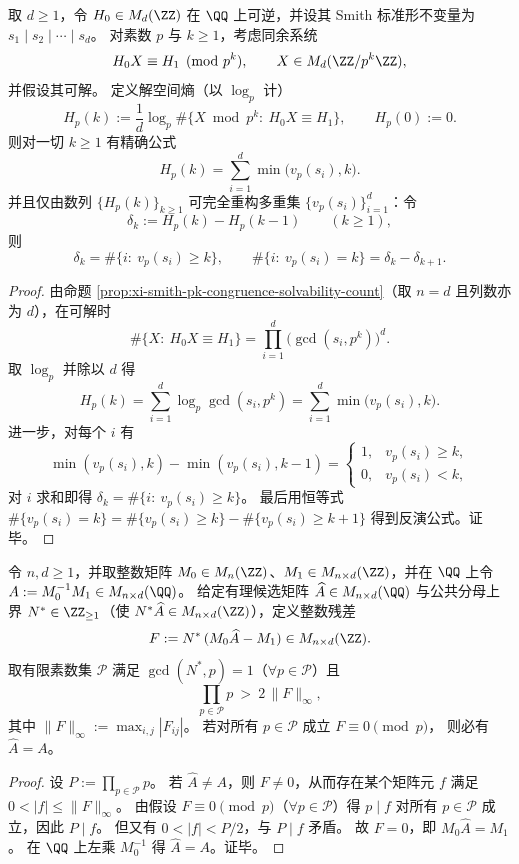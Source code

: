 \begin{theorem}\label{thm:xi-smith-entropy-inverts-vp-invariants}
取 \(d\ge 1\)，令 \(H_0\in M_d(\ZZ)\) 在 \(\QQ\) 上可逆，并设其 Smith 标准形不变量为
\(
s_1\mid s_2\mid\cdots\mid s_d
\)。
对素数 \(p\) 与 \(k\ge 1\)，考虑同余系统
\[
H_0X\equiv H_1\pmod{p^k},\qquad X\in M_d(\ZZ/p^k\ZZ),
\]
并假设其可解。
定义解空间熵（以 \(\log_p\) 计）
\[
H_p(k):=\frac{1}{d}\log_p\#\bigl\{X\bmod p^k:\ H_0X\equiv H_1\bigr\},
\qquad H_p(0):=0.
\]
则对一切 \(k\ge 1\) 有精确公式
\[
H_p(k)=\sum_{i=1}^{d}\min\bigl(v_p(s_i),k\bigr).
\]
并且仅由数列 \(\{H_p(k)\}_{k\ge 1}\) 可完全重构多重集 \(\{v_p(s_i)\}_{i=1}^{d}\)：令
\[
\delta_k:=H_p(k)-H_p(k-1)\qquad(k\ge 1),
\]
则
\[
\delta_k=\#\{i:\ v_p(s_i)\ge k\},
\qquad
\#\{i:\ v_p(s_i)=k\}=\delta_k-\delta_{k+1}.
\]
\end{theorem}
\begin{proof}
由命题 \ref{prop:xi-smith-pk-congruence-solvability-count}（取 \(n=d\) 且列数亦为 \(d\)），在可解时
\[
\#\{X:\ H_0X\equiv H_1\}
=\prod_{i=1}^{d}\bigl(\gcd(s_i,p^k)\bigr)^{d}.
\]
取 \(\log_p\) 并除以 \(d\) 得
\[
H_p(k)=\sum_{i=1}^{d}\log_p\gcd(s_i,p^k)
=\sum_{i=1}^{d}\min\bigl(v_p(s_i),k\bigr).
\]
进一步，对每个 \(i\) 有
\[
\min(v_p(s_i),k)-\min(v_p(s_i),k-1)=
\begin{cases}
1,& v_p(s_i)\ge k,\\
0,& v_p(s_i)< k,
\end{cases}
\]
对 \(i\) 求和即得 \(\delta_k=\#\{i:\ v_p(s_i)\ge k\}\)。
最后用恒等式
\(
\#\{v_p(s_i)=k\}=\#\{v_p(s_i)\ge k\}-\#\{v_p(s_i)\ge k+1\}
\)
得到反演公式。证毕。
\end{proof}




\begin{proposition}\label{prop:xi-finite-prime-refutation-audit}
令 \(n,d\ge 1\)，并取整数矩阵 \(M_0\in M_n(\ZZ)\)、\(M_1\in M_{n\times d}(\ZZ)\)，并在 \(\QQ\) 上令
\(
A:=M_0^{-1}M_1\in M_{n\times d}(\QQ)
\)。
给定有理候选矩阵 \(\widehat A\in M_{n\times d}(\QQ)\) 与公共分母上界 \(N^\ast\in\ZZ_{\ge 1}\)（使 \(N^\ast\widehat A\in M_{n\times d}(\ZZ)\)），定义整数残差
\[
F:=N^\ast\,(M_0\widehat A-M_1)\in M_{n\times d}(\ZZ).
\]
取有限素数集 \(\mathcal P\) 满足 \(\gcd(N^\ast,p)=1\)（\(\forall p\in\mathcal P\)）且
\[
\prod_{p\in\mathcal P}p\ >\ 2\,\|F\|_\infty,
\]
其中 \(\|F\|_\infty:=\max_{i,j}|F_{ij}|\)。
若对所有 \(p\in\mathcal P\) 成立
\(
F\equiv 0\pmod p
\)，
则必有 \(\widehat A=A\)。
\end{proposition}
\begin{proof}
设 \(P:=\prod_{p\in\mathcal P}p\)。
若 \(\widehat A\neq A\)，则 \(F\neq 0\)，从而存在某个矩阵元 \(f\) 满足 \(0<|f|\le \|F\|_\infty\)。
由假设 \(F\equiv 0\pmod p\)（\(\forall p\in\mathcal P\)）得 \(p\mid f\) 对所有 \(p\in\mathcal P\) 成立，因此 \(P\mid f\)。
但又有 \(0<|f|<P/2\)，与 \(P\mid f\) 矛盾。
故 \(F=0\)，即 \(M_0\widehat A=M_1\)。
在 \(\QQ\) 上左乘 \(M_0^{-1}\) 得 \(\widehat A=A\)。证毕。
\end{proof}

